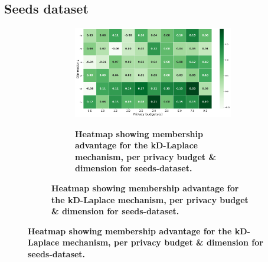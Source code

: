 {\subsection{Seeds dataset}
\begin{figure}[H]
  \centering
  \begin{subfigure}[b]{0.75\textwidth}
    \begin{subfigure}[c]{1\textwidth}
      \caption{\textbf{Heatmap showing membership advantage for the kD-Laplace mechanism, per privacy budget \& dimension for seeds-dataset.}}
      \includegraphics[width=1\textwidth]{Results/nd-laplace/nd-Laplace/seeds-dataset/attack_adv.png}
      \label{fig:privacy_seeds-dataset_adversial_advantage_kd-laplace}
    \end{subfigure}
    \vfill %


\end{subfigure}
\end{figure}}
